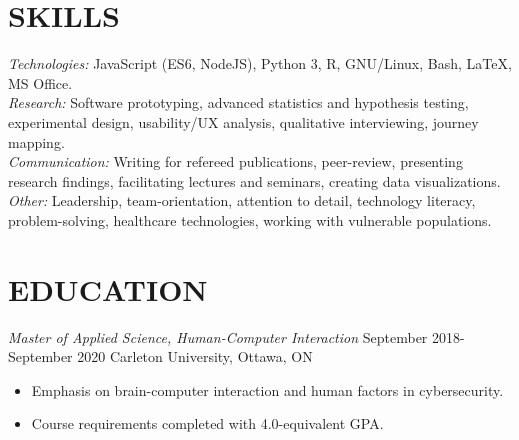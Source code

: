 \documentclass[10pt]{res} %
\begin{document}
\begin{resume}





\section{SKILLS}

{\sl Technologies:} JavaScript (ES6, NodeJS), Python 3, R, GNU/Linux, Bash,
\LaTeX, MS Office.
\vspace{2mm}\\
{\sl Research:} Software prototyping, advanced statistics and hypothesis testing, experimental design,
usability/UX analysis, qualitative interviewing, journey mapping.
\vspace{2mm}\\
{\sl Communication:} Writing for refereed publications, peer-review, presenting
research findings, facilitating lectures and seminars, creating data
visualizations.
\vspace{2mm}\\
{\sl Other:} Leadership, team-orientation, attention to detail, technology
literacy, problem-solving, healthcare technologies, working with vulnerable
populations.


\section{EDUCATION}
{\sl Master of Applied Science, Human-Computer Interaction} \hfill September 2018-September 2020\newline
Carleton University, Ottawa, ON
\begin{itemize}
  \item Emphasis on brain-computer interaction and human factors in cybersecurity.
  \item Course requirements completed with 4.0-equivalent GPA.
\end{itemize}{}


\end{resume}
\end{document}
